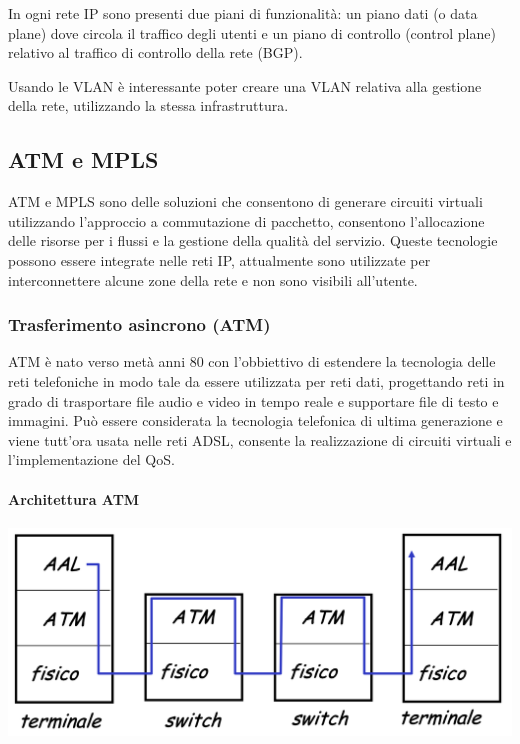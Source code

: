 \documentclass{report}
\begin{document}
In ogni rete IP sono presenti due piani di funzionalità: un piano dati
(o data plane) dove circola il traffico degli utenti e un piano di
controllo (control plane) relativo al traffico di controllo della rete
(BGP).

Usando le VLAN è interessante poter creare una VLAN relativa alla
gestione della rete, utilizzando la stessa infrastruttura.

\hypertarget{header-n362}{%
\subsection{ATM e MPLS}\label{header-n362}}

ATM e MPLS sono delle soluzioni che consentono di generare circuiti
virtuali utilizzando l'approccio a commutazione di pacchetto, consentono
l'allocazione delle risorse per i flussi e la gestione della qualità del
servizio. Queste tecnologie possono essere integrate nelle reti IP,
attualmente sono utilizzate per interconnettere alcune zone della rete e
non sono visibili all'utente.

\hypertarget{header-n364}{%
\subsubsection{Trasferimento asincrono (ATM)}\label{header-n364}}

ATM è nato verso metà anni 80 con l'obbiettivo di estendere la
tecnologia delle reti telefoniche in modo tale da essere utilizzata per
reti dati, progettando reti in grado di trasportare file audio e video
in tempo reale e supportare file di testo e immagini. Può essere
considerata la tecnologia telefonica di ultima generazione e viene
tutt'ora usata nelle reti ADSL, consente la realizzazione di circuiti
virtuali e l'implementazione del QoS.

\hypertarget{header-n366}{%
\paragraph{Architettura ATM}\label{header-n366}}

\begin{center}
		\includegraphics[width=0.7\linewidth]{atm}
	\end{center}
\end{document}
